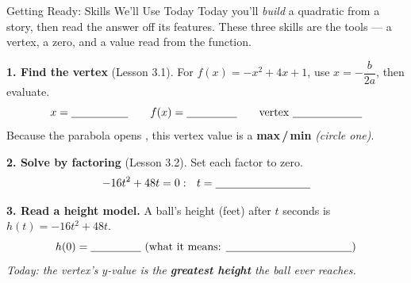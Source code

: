 \documentclass[10pt]{article}
\begin{document}

\vspace{0.10in}

\begin{notesbox}{Getting Ready: Skills We'll Use Today}
\small Today you'll \emph{build} a quadratic from a story, then read the answer off its features. These three skills
are the tools --- a vertex, a zero, and a value read from the function.

\vspace{4pt}
\textbf{1. Find the vertex} (Lesson 3.1). For $f(x)=-x^2+4x+1$, use $x=-\dfrac{b}{2a}$, then evaluate.
\[
  x=\blank{1.8cm} \qquad f(x)=\blank{1.6cm} \qquad \text{vertex } \blank{2.2cm}
\]
Because the parabola opens \underline{\hspace{2.2cm}}, this vertex value is a \textbf{max\,/\,min} \emph{(circle one)}.

\vspace{4pt}
\textbf{2. Solve by factoring} (Lesson 3.2). Set each factor to zero.
\[
  -16t^2+48t=0:\ \ t=\blank{3.0cm}
\]

\vspace{4pt}
\textbf{3. Read a height model.} A ball's height (feet) after $t$ seconds is $h(t)=-16t^2+48t$.
\[
  h(0)=\blank{1.6cm}\ \text{(what it means: \blank{4.0cm})}
\]
\emph{Today: the vertex's $y$-value is the \textbf{greatest height} the ball ever reaches.}
\end{notesbox}
\end{document}
